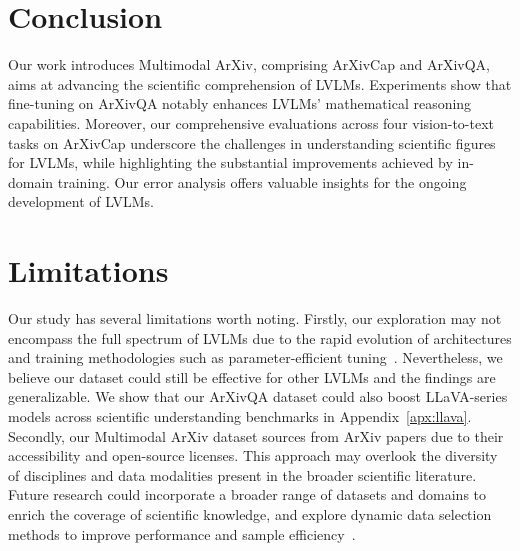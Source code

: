 \section{Conclusion}
\label{sec:conclusion}
Our work introduces Multimodal ArXiv, comprising ArXivCap and ArXivQA, aims at advancing the scientific comprehension of LVLMs. 
Experiments show that fine-tuning on ArXivQA notably enhances LVLMs' mathematical reasoning capabilities. 
Moreover, our comprehensive evaluations across four vision-to-text tasks on ArXivCap underscore the challenges in understanding scientific figures for LVLMs, while highlighting the substantial improvements achieved by in-domain training. Our error analysis offers valuable insights for the ongoing development of LVLMs.





\section*{Limitations}
Our study has several limitations worth noting. Firstly, our exploration may not encompass the full spectrum of LVLMs due to the rapid evolution of architectures and training methodologies such as parameter-efficient tuning~\citep{hu2021lora,ma2024paramtuning}.
Nevertheless, we believe our dataset could still be effective for other LVLMs and the findings are generalizable.
We show that our ArXivQA dataset could also boost LLaVA-series models across scientific understanding benchmarks in Appendix~\ref{apx:llava}.
Secondly, our Multimodal ArXiv dataset sources from ArXiv papers due to their accessibility and open-source licenses. This approach may overlook the diversity of disciplines and data modalities present in the broader scientific literature. 
Future research could incorporate a broader range of datasets and domains to enrich the coverage of scientific knowledge, and explore dynamic data selection methods to improve performance and sample efficiency~\citep{li-etal-2021-dynamic,chen2024vlm_select}.


